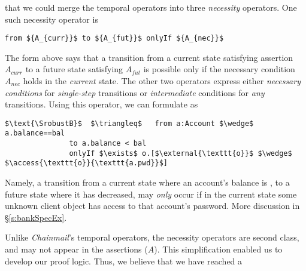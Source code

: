   that we could merge the temporal operators into three
  \emph{necessity} operators. 
 One such necessity operator is
 
 \begin{lstlisting}[mathescape=true, language=chainmail, frame=lines]
                                from ${A_{curr}}$ to ${A_{fut}}$ onlyIf ${A_{nec}}$ 
\end{lstlisting}
The  form   {above} says that %
a  {transition} from a current state satisfying assertion $A_{curr}$ to a future
state satisfying $A_{fut}$ %
is possible only if the   necessary 
condition
$A_{nec}$ holds in the \emph{current} state.
The other two operators express either \emph{necessary conditions} for
\emph{single-step} transitions %
or \emph{intermediate} conditions for \emph{any} transitions.
Using this operator, we can formulate  \SrobustB %
as
\begin{lstlisting}[language = Chainmail, mathescape=true, frame=lines]
$\text{\SrobustB}$  $\triangleq$   from a:Account $\wedge$ a.balance==bal
               to a.balance < bal
               onlyIf $\exists$ o.[$\external{\texttt{o}}$ $\wedge$ $\access{\texttt{o}}{\texttt{a.pwd}}$]
\end{lstlisting}
Namely, a transition from a  {current} state where an account's balance is , to a  {future} state where 
it has decreased, may \emph{only} occur if  {in the current state} some unknown client object  
has access to that account's password. 
More discussion in \S\ref{s:bankSpecEx}. 

  
Unlike  \emph{Chainmail}'s temporal operators, 
 the necessity operators %
 are second class, and may not appear in the assertions ($A$).
 This simplification enabled us to develop our proof logic. 
 Thus, we believe that we have reached a 



